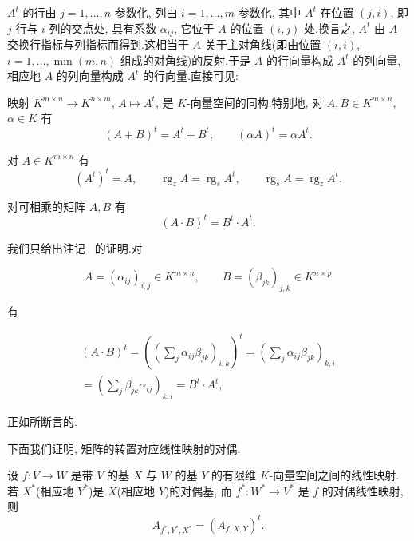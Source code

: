 $A^t$ 的行由 $j = 1, \ldots, n$ 参数化, 列由 $i = 1, \ldots, m$ 参数化, 其中 $A^t$ 在位置 $(j, i)$, 即 $j$ 行与 $i$ 列的交点处, 具有系数 $\alpha_{ij}$, 它位于 $A$ 的位置 $(i, j)$ 处.换言之, $A^t$ 由 $A$ 交换行指标与列指标而得到.这相当于 $A$ 关于主对角线(即由位置 $(i, i)$, $i = 1, \ldots, \min(m, n)$ 组成的对角线)的反射.于是 $A$ 的行向量构成 $A^t$ 的列向量, 相应地 $A$ 的列向量构成 $A^t$ 的行向量.直接可见:

\begin{remark}\label{rem:3.2.6}
映射 $K^{m \times n} \longrightarrow K^{n \times m}$, $A \longmapsto A^t$, 是 $K$-向量空间的同构.特别地, 对 $A, B \in K^{m \times n}$, $\alpha \in K$ 有
\[
(A + B)^t = A^t + B^t, \qquad (\alpha A)^t = \alpha A^t\text{.}
\]
\end{remark}

\begin{remark}\label{rem:3.2.7}
对 $A \in K^{m \times n}$ 有
\[
(A^t)^t = A, \qquad \operatorname{rg}_z A = \operatorname{rg}_s A^t, \qquad \operatorname{rg}_s A = \operatorname{rg}_z A^t\text{.}
\]
\end{remark}

\begin{remark}\label{rem:3.2.8}
对可相乘的矩阵 $A, B$ 有
\[
(A \cdot B)^t = B^t \cdot A^t\text{.}
\]
\end{remark}

我们只给出注记~ 的证明.对

\[
A = (\alpha_{ij})_{i, j} \in K^{m \times n}, \qquad B = (\beta_{jk})_{j, k} \in K^{n \times p}
\]

有

\[
\begin{array}{c}
(A \cdot B)^t = \left(\left(\sum_j \alpha_{ij}\beta_{jk}\right)_{i, k}\right)^t
= \left(\sum_j \alpha_{ij}\beta_{jk}\right)_{k, i} \\
= \left(\sum_j \beta_{jk}\alpha_{ij}\right)_{k, i} = B^t \cdot A^t,
\end{array}
\]

正如所断言的.

下面我们证明, 矩阵的转置对应线性映射的对偶.

\begin{theorem}\label{thm:3.2.9}
设 $f \colon V \longrightarrow W$ 是带 $V$ 的基 $X$ 与 $W$ 的基 $Y$ 的有限维 $K$-向量空间之间的线性映射.若 $X^*$(相应地 $Y^*$)是 $X$(相应地 $Y$)的对偶基, 而 $f^* \colon W^* \longrightarrow V^*$ 是 $f$ 的对偶线性映射, 则
\[
A_{f^*, Y^*, X^*} = (A_{f, X, Y})^t\text{.}
\]
\end{theorem}

